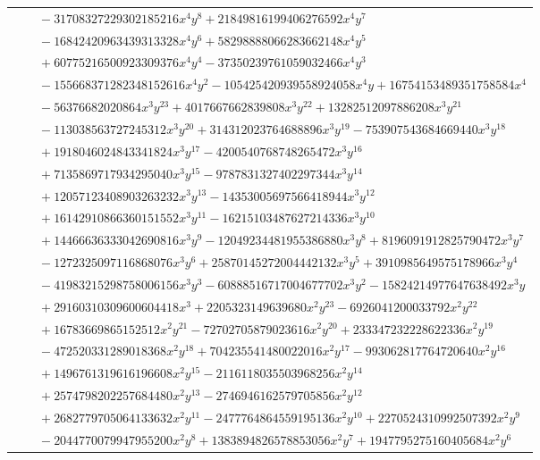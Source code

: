 \documentclass[11pt]{article}
\begin{document}
\begin{longtable}{@{}ll@{}}
 & $\quad -31708327229302185216x^{4}y^{8}+21849816199406276592x^{4}y^{7}$\\
 & $\quad -16842420963439313328x^{4}y^{6}+58298888066283662148x^{4}y^{5}$\\
 & $\quad +60775216500923309376x^{4}y^{4}-37350239761059032466x^{4}y^{3}$\\
 & $\quad -155668371282348152616x^{4}y^{2}-105425420939558924058x^{4}y+16754153489351758584x^{4}$\\
 & $\quad -56376682020864x^{3}y^{23}+4017667662839808x^{3}y^{22}+13282512097886208x^{3}y^{21}$\\
 & $\quad -113038563727245312x^{3}y^{20}+314312023764688896x^{3}y^{19}-753907543684669440x^{3}y^{18}$\\
 & $\quad +1918046024843341824x^{3}y^{17}-4200540768748265472x^{3}y^{16}$\\
 & $\quad +7135869717934295040x^{3}y^{15}-9787831327402297344x^{3}y^{14}$\\
 & $\quad +12057123408903263232x^{3}y^{13}-14353005697566418944x^{3}y^{12}$\\
 & $\quad +16142910866360151552x^{3}y^{11}-16215103487627214336x^{3}y^{10}$\\
 & $\quad +14466636333042690816x^{3}y^{9}-12049234481955386880x^{3}y^{8}+8196091912825790472x^{3}y^{7}$\\
 & $\quad -1272325097116868076x^{3}y^{6}+25870145272004442132x^{3}y^{5}+3910985649575178966x^{3}y^{4}$\\
 & $\quad -41983215298758006156x^{3}y^{3}-60888516717004677702x^{3}y^{2}-15824214977647638492x^{3}y$\\
 & $\quad +29160310309600604418x^{3}+2205323149639680x^{2}y^{23}-6926041200033792x^{2}y^{22}$\\
 & $\quad +16783669865152512x^{2}y^{21}-72702705879023616x^{2}y^{20}+233347232228622336x^{2}y^{19}$\\
 & $\quad -472520331289018368x^{2}y^{18}+704235541480022016x^{2}y^{17}-993062817764720640x^{2}y^{16}$\\
 & $\quad +1496761319616196608x^{2}y^{15}-2116118035503968256x^{2}y^{14}$\\
 & $\quad +2574798202257684480x^{2}y^{13}-2746946162579705856x^{2}y^{12}$\\
 & $\quad +2682779705064133632x^{2}y^{11}-2477764864559195136x^{2}y^{10}+2270524310992507392x^{2}y^{9}$\\
 & $\quad -2044770079947955200x^{2}y^{8}+1383894826578853056x^{2}y^{7}+1947795275160405684x^{2}y^{6}$\\

\end{longtable}
\end{document}
